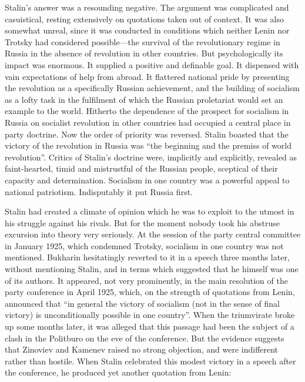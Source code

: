Stalin's answer was a resounding negative. The argument was complicated and casuistical, resting extensively on quotations taken out of context. It was also somewhat unreal, since it was conducted in conditions which neither Lenin nor Trotsky had considered possible---the survival of the revolutionary regime in Russia in the absence of revolution in other countries. But psychologically its impact was enormous. It supplied a positive and definable goal. It dispensed with vain expectations of help from abroad. It flattered national pride by presenting the revolution as a specifically Russian achievement, and the building of socialism as a lofty task in the fulfilment of which the Russian proletariat would set an example to the world. Hitherto the dependence of the prospect for socialism in Russia on socialist revolution in other countries had occupied a central place in party doctrine. Now the order of priority was reversed. Stalin boasted that the victory of the revolution in Russia was ``the beginning and the premiss of world revolution''. Critics of Stalin's doctrine were, implicitly and explicitly, revealed as faint-hearted, timid and mistrustful of the Russian people, sceptical of their capacity and determination. Socialism in one country was a powerful appeal to national patriotism. Indisputably it put Russia first. 

Stalin had created a climate of opinion which he was to exploit to the utmost in his struggle against his rivals. But for the moment nobody took his abstruse excursion into theory very seriously. At the session of the party central committee in January 1925, which condemned Trotsky, socialism in one country was not mentioned. Bukharin hesitatingly reverted to it in a speech three months later, without mentioning Stalin, and in terms which suggested that he himself was one of its authors. It appeared, not very prominently, in the main resolution of the party conference in April 1925, which, on the strength of quotations from Lenin, announced that ``in general the victory of socialism (not in the sense of final victory) is unconditionally possible in one country''. When the triumvirate broke up some months later, it was alleged that this passage had been the subject of a clash in the Politburo on the eve of the conference. But the evidence suggests that Zinoviev and Kamenev raised no strong objection, and were indifferent rather than hostile. When Stalin celebrated this modest victory in a speech after the conference, he produced yet another quotation from Lenin: 

